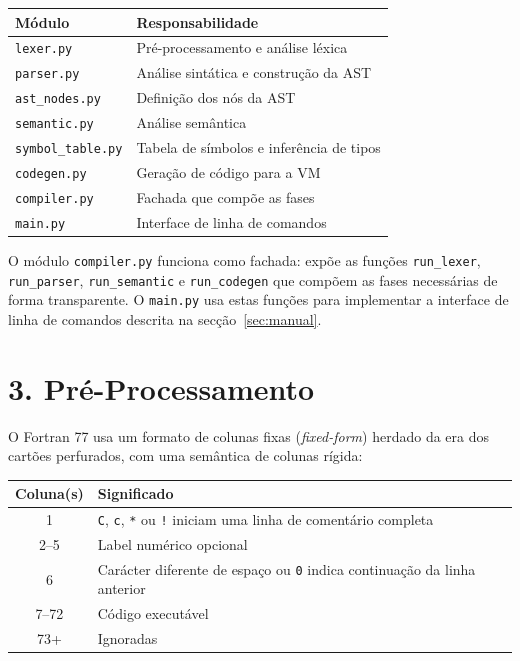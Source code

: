 \documentclass[a4paper]{article}
\begin{document}
\begin{center}
\begin{tabular}{ll}
\toprule
\textbf{Módulo} & \textbf{Responsabilidade} \\
\midrule
\texttt{lexer.py}         & Pré-processamento e análise léxica \\
\texttt{parser.py}        & Análise sintática e construção da AST \\
\texttt{ast\_nodes.py}    & Definição dos nós da AST \\
\texttt{semantic.py}      & Análise semântica \\
\texttt{symbol\_table.py} & Tabela de símbolos e inferência de tipos \\
\texttt{codegen.py}       & Geração de código para a VM \\
\texttt{compiler.py}      & Fachada que compõe as fases \\
\texttt{main.py}          & Interface de linha de comandos \\
\bottomrule
\end{tabular}
\end{center}

\noindent O módulo \texttt{compiler.py} funciona como fachada: expõe as funções \texttt{run\_lexer}, \texttt{run\_parser}, \texttt{run\_semantic} e \texttt{run\_codegen} que compõem as fases necessárias de forma transparente. O \texttt{main.py} usa estas funções para implementar a interface de linha de comandos descrita na secção~\ref{sec:manual}.

\section*{3. Pré-Processamento}

\noindent O Fortran 77 usa um formato de colunas fixas (\textit{fixed-form}) herdado da era dos cartões perfurados, com uma semântica de colunas rígida:

\begin{center}
\begin{tabular}{cl}
\toprule
\textbf{Coluna(s)} & \textbf{Significado} \\
\midrule
1       & \texttt{C}, \texttt{c}, \texttt{*} ou \texttt{!} iniciam uma linha de comentário completa \\
2--5    & Label numérico opcional \\
6       & Carácter diferente de espaço ou \texttt{0} indica continuação da linha anterior \\
7--72   & Código executável \\
73+     & Ignoradas \\
\bottomrule
\end{tabular}
\end{center}
\end{document}
